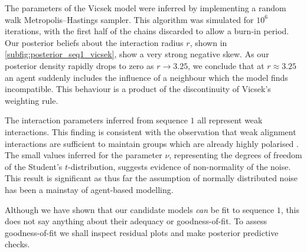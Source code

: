 The parameters of the Vicsek model were inferred by implementing a random walk
Metropolis--Hastings sampler. This algorithm was simulated for $10^6$
iterations, with the first half of the chains discarded to allow a burn-in
period. Our posterior beliefs about the interaction radius $r$, shown in
\cref{subfig:posterior_seq1_vicsek}, show a very strong negative skew. As our
posterior density rapidly drops to zero as $r\rightarrow3.25$, we conclude  
that at $r\approx3.25$ an agent suddenly includes the influence of a neighbour
which the model finds incompatible. This behaviour is a product of the
discontinuity of Vicsek's weighting rule.

The interaction parameters inferred from sequence $1$ all represent weak
interactions. This finding is consistent with the observation that weak
alignment interactions are sufficient to maintain groups which are already
highly polarised \parencite{jhawar20}. The small values inferred for the
parameter $\nu$, representing the degrees of freedom of the Student's
$t$-distribution, suggests evidence of non-normality of the noise. This result
is significant as thus far the assumption of normally distributed noise has
been a mainstay of agent-based modelling.

Although we have shown that our candidate models \emph{can} be fit to sequence
$1$, this does not say anything about their adequacy or goodness-of-fit. To
assess goodness-of-fit we shall inspect residual plots and make posterior
predictive checks.


